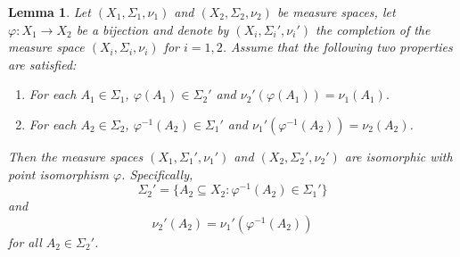 \documentclass[11pt, letter]{book}
\newtheorem{lemma}[theorem]{Lemma}
\begin{document}
\begin{framed}
\begin{lemma}\label{lem:PushforwardLemma}
Let $(X_1,\Sigma_1,\nu_1)$ and $(X_2,\Sigma_2,\nu_2)$ be measure spaces, let $\varphi:X_1\to X_2$ be a bijection and denote by $(X_i,\Sigma_i',\nu_i')$ the completion of the measure space $(X_i,\Sigma_i,\nu_i)$ for $i=1,2$. Assume that the following two properties are satisfied:
\begin{enumerate}
\item\label{property:PushforwardLemma1} For each $A_1\in\Sigma_1$, $\varphi(A_1)\in\Sigma_2'$ and $\nu_2'(\varphi(A_1))=\nu_1(A_1).$
\item\label{property:PushforwardLemma2} For each $A_2\in\Sigma_2$, $\varphi^{-1}(A_2)\in \Sigma_1'$ and $\nu_1'(\varphi^{-1}(A_2))=\nu_2(A_2)$.
\end{enumerate}
Then the measure spaces $(X_1,\Sigma_1',\nu_1')$ and $(X_2,\Sigma_2',\nu_2')$ are isomorphic with point isomorphism $\varphi$. Specifically,
\begin{equation}\label{eq:PushforwardLemma1}
\Sigma_2'=\{A_2\subseteq X_2: \varphi^{-1}(A_2)\in\Sigma_1'\}
\end{equation}
and
\begin{equation}\label{eq:PushforwardLemma2}
\nu_2'(A_2)=\nu_1'(\varphi^{-1}(A_2))
\end{equation}
for all $A_2\in\Sigma_2'$.
\end{lemma}
\end{framed}
\end{document}
